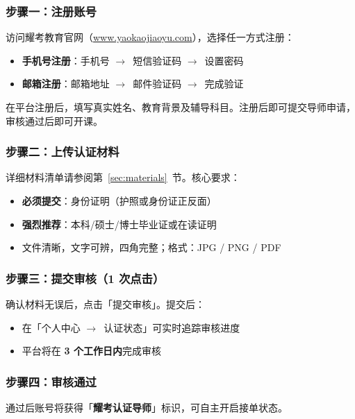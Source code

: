 \documentclass[a4paper,10pt]{article}
\newcommand{\arrowright}{$\rightarrow$}
\begin{document}
\vspace{8pt}

\subsubsection{步骤一：注册账号}

访问耀考教育官网（\href{https://www.yaokaojiaoyu.com}{www.yaokaojiaoyu.com}），选择任一方式注册：
\begin{itemize}
  \item \textbf{手机号注册}：手机号 \arrowright\ 短信验证码 \arrowright\ 设置密码
  \item \textbf{邮箱注册}：邮箱地址 \arrowright\ 邮件验证码 \arrowright\ 完成验证
\end{itemize}

在平台注册后，填写真实姓名、教育背景及辅导科目。注册后即可提交导师申请，审核通过后即可开课。

\subsubsection{步骤二：上传认证材料}

详细材料清单请参阅第~\ref{sec:materials}~节。核心要求：
\begin{itemize}
  \item \textbf{必须提交}：身份证明（护照或身份证正反面）
  \item \textbf{强烈推荐}：本科/硕士/博士毕业证或在读证明
  \item 文件清晰，文字可辨，四角完整；格式：JPG / PNG / PDF
\end{itemize}

\subsubsection{步骤三：提交审核（1 次点击）}

确认材料无误后，点击「提交审核」。提交后：
\begin{itemize}
  \item 在「个人中心 \arrowright\ 认证状态」可实时追踪审核进度
  \item 平台将在 \textbf{3 个工作日内}完成审核
\end{itemize}

\subsubsection{步骤四：审核通过}

通过后账号将获得「\textbf{耀考认证导师}」标识，可自主开启接单状态。
\end{document}
